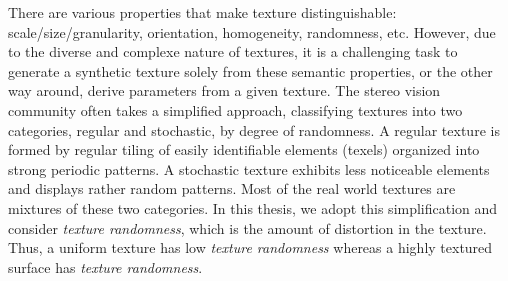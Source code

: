 There are various properties that make texture distinguishable: scale/size/granularity, orientation, homogeneity, randomness, etc. However, due to the diverse and complexe nature of textures, it is a challenging task to generate a synthetic texture solely from these semantic properties, or the other way around, derive parameters from a given texture. The stereo vision community often takes a simplified approach, classifying textures into two categories, regular and stochastic, by degree of randomness. A regular texture is formed by regular tiling of easily identifiable elements (texels) organized into strong periodic patterns. A stochastic texture exhibits less noticeable elements and displays rather random patterns. Most of the real world textures are mixtures of these two categories. In this thesis, we adopt this simplification and consider \textit{texture randomness}, which is the amount of distortion in the texture. Thus, a uniform texture has low \textit{texture randomness} whereas a highly textured surface has \textit{texture randomness}.




